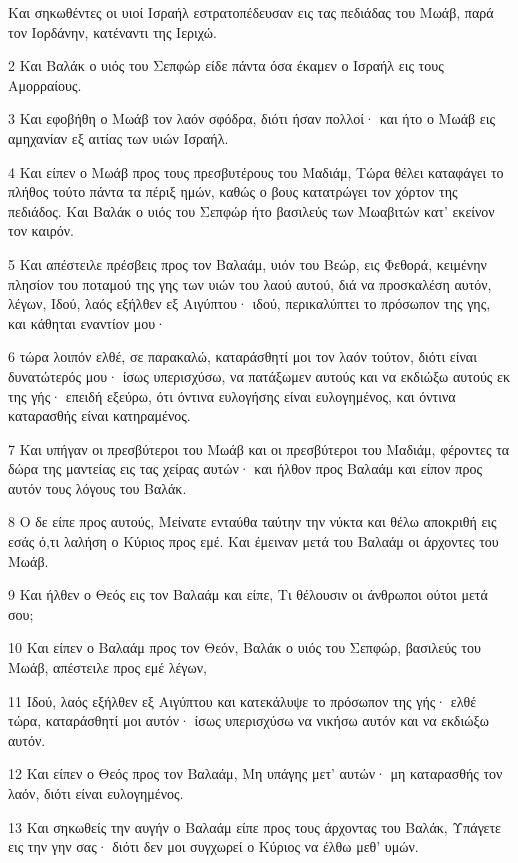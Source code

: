 \par Και σηκωθέντες οι υιοί Ισραήλ εστρατοπέδευσαν εις τας πεδιάδας του Μωάβ, παρά τον Ιορδάνην, κατέναντι της Ιεριχώ.
\par 2 Και Βαλάκ ο υιός του Σεπφώρ είδε πάντα όσα έκαμεν ο Ισραήλ εις τους Αμορραίους.
\par 3 Και εφοβήθη ο Μωάβ τον λαόν σφόδρα, διότι ήσαν πολλοί· και ήτο ο Μωάβ εις αμηχανίαν εξ αιτίας των υιών Ισραήλ.
\par 4 Και είπεν ο Μωάβ προς τους πρεσβυτέρους του Μαδιάμ, Τώρα θέλει καταφάγει το πλήθος τούτο πάντα τα πέριξ ημών, καθώς ο βους κατατρώγει τον χόρτον της πεδιάδος. Και Βαλάκ ο υιός του Σεπφώρ ήτο βασιλεύς των Μωαβιτών κατ' εκείνον τον καιρόν.
\par 5 Και απέστειλε πρέσβεις προς τον Βαλαάμ, υιόν του Βεώρ, εις Φεθορά, κειμένην πλησίον του ποταμού της γης των υιών του λαού αυτού, διά να προσκαλέση αυτόν, λέγων, Ιδού, λαός εξήλθεν εξ Αιγύπτου· ιδού, περικαλύπτει το πρόσωπον της γης, και κάθηται εναντίον μου·
\par 6 τώρα λοιπόν ελθέ, σε παρακαλώ, καταράσθητί μοι τον λαόν τούτον, διότι είναι δυνατώτερός μου· ίσως υπερισχύσω, να πατάξωμεν αυτούς και να εκδιώξω αυτούς εκ της γής· επειδή εξεύρω, ότι όντινα ευλογήσης είναι ευλογημένος, και όντινα καταρασθής είναι κατηραμένος.
\par 7 Και υπήγαν οι πρεσβύτεροι του Μωάβ και οι πρεσβύτεροι του Μαδιάμ, φέροντες τα δώρα της μαντείας εις τας χείρας αυτών· και ήλθον προς Βαλαάμ και είπον προς αυτόν τους λόγους του Βαλάκ.
\par 8 Ο δε είπε προς αυτούς, Μείνατε ενταύθα ταύτην την νύκτα και θέλω αποκριθή εις εσάς ό,τι λαλήση ο Κύριος προς εμέ. Και έμειναν μετά του Βαλαάμ οι άρχοντες του Μωάβ.
\par 9 Και ήλθεν ο Θεός εις τον Βαλαάμ και είπε, Τι θέλουσιν οι άνθρωποι ούτοι μετά σου;
\par 10 Και είπεν ο Βαλαάμ προς τον Θεόν, Βαλάκ ο υιός του Σεπφώρ, βασιλεύς του Μωάβ, απέστειλε προς εμέ λέγων,
\par 11 Ιδού, λαός εξήλθεν εξ Αιγύπτου και κατεκάλυψε το πρόσωπον της γής· ελθέ τώρα, καταράσθητί μοι αυτόν· ίσως υπερισχύσω να νικήσω αυτόν και να εκδιώξω αυτόν.
\par 12 Και είπεν ο Θεός προς τον Βαλαάμ, Μη υπάγης μετ' αυτών· μη καταρασθής τον λαόν, διότι είναι ευλογημένος.
\par 13 Και σηκωθείς την αυγήν ο Βαλαάμ είπε προς τους άρχοντας του Βαλάκ, Υπάγετε εις την γην σας· διότι δεν μοι συγχωρεί ο Κύριος να έλθω μεθ' υμών.
